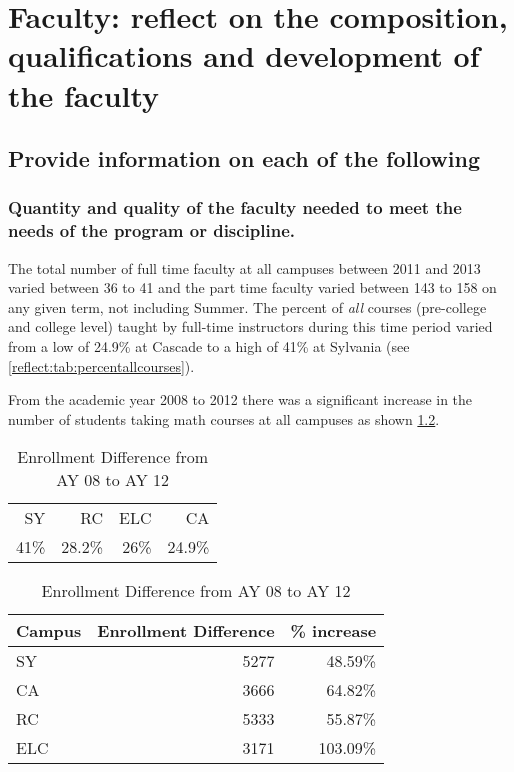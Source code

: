 \chapter[Faculty composition and qualifications]{Faculty:  reflect on the
composition, qualifications and development of the faculty}
\section{Provide information on each of the following}
\subsection{Quantity and quality of the faculty needed to meet the needs of the
program or discipline.}
The total number of full time faculty at all campuses between 2011 and 2013
varied between 36 to 41 and the 
part time faculty varied between 143 to 158 on any given term,  not including
Summer.     The percent of \emph{all} courses (pre-college and college level)
taught by full-time instructors during this time period varied from a low of
24.9\% at Cascade to a high of 41\% at Sylvania (see
\cref{reflect:tab:percentallcourses}).

From the academic year 2008 to 2012 there was a significant increase in the
number of students taking math courses at all campuses as shown
\cref{reflect:tab:enrollment}. 
\begin{table}[!htb]
  \begin{widepage}
	\begin{minipage}[t]{.4\textwidth}
		\centering
		\caption{Percentage of courses taught by full-time faculty from Summer2011--2013}
		\label{reflect:tab:percentallcourses}
		\begin{tabular}{rrrr}
			\toprule
			SY   & RC     & ELC  & CA     \\    
			41\% & 28.2\% & 26\% & 24.9\% \\
			\bottomrule
		\end{tabular}
	\end{minipage}%
	\begin{minipage}[t]{.6\textwidth}
		\centering
		\caption{Enrollment Difference from AY 08 to AY 12}
        \label{reflect:tab:enrollment}
		\begin{tabular}{lrr}
          \toprule
			Campus & Enrollment Difference & \% increase \\
            \midrule
			SY     & 5277                  & 48.59\%     \\
			CA     & 3666                  & 64.82\%     \\
			RC     & 5333                  & 55.87\%     \\
			ELC    & 3171                  & 103.09\%    \\
            \bottomrule
		\end{tabular}
	\end{minipage}
  \end{widepage}
\end{table}

